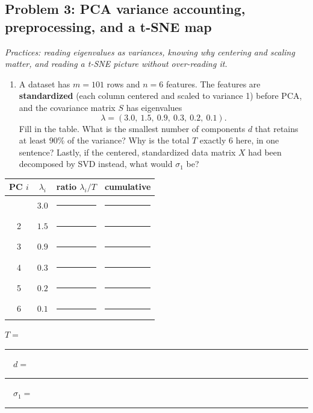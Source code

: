 \documentclass[
  11pt,
]{article}
\newcounter{none} %
\providecommand{\tightlist}{%
  \setlength{\itemsep}{0pt}\setlength{\parskip}{0pt}}
\newcommand{\answerspace}[1]{\par\vspace*{#1}}  %
\newcommand{\blank}[1][1.2in]{\rule{#1}{0.4pt}}
\newcommand{\answerpage}{\clearpage}
\begin{document}
\answerspace{1.6in}

\answerpage

\subsection{Problem 3: PCA variance accounting, preprocessing, and a
t-SNE
map}\label{problem-3-pca-variance-accounting-preprocessing-and-a-t-sne-map}

\emph{Practices: reading eigenvalues as variances, knowing why centering
and scaling matter, and reading a t-SNE picture without over-reading
it.}

\begin{enumerate}
\def\labelenumi{(\alph{enumi})}
\tightlist
\item
  A dataset has \(m = 101\) rows and \(n = 6\) features. The features
  are \textbf{standardized} (each column centered and scaled to variance
  1) before PCA, and the covariance matrix \(S\) has eigenvalues \[
  \lambda = (3.0,\ 1.5,\ 0.9,\ 0.3,\ 0.2,\ 0.1).
  \] Fill in the table. What is the smallest number of components \(d\)
  that retains at least \(90\%\) of the variance? Why is the total \(T\)
  exactly \(6\) here, in one sentence? Lastly, if the centered,
  standardized data matrix \(X\) had been decomposed by SVD instead,
  what would \(\sigma_1\) be?
\end{enumerate}

{\def\LTcaptype{none} %
\begin{longtable}[]{@{}cccc@{}}
\toprule\noalign{}
PC \(i\) & \(\lambda_i\) & ratio \(\lambda_i/T\) & cumulative \\
\midrule\noalign{}
\endhead
\bottomrule\noalign{}
\endlastfoot
1 & \(3.0\) & \blank[0.8in] & \blank[0.8in] \\
2 & \(1.5\) & \blank[0.8in] & \blank[0.8in] \\
3 & \(0.9\) & \blank[0.8in] & \blank[0.8in] \\
4 & \(0.3\) & \blank[0.8in] & \blank[0.8in] \\
5 & \(0.2\) & \blank[0.8in] & \blank[0.8in] \\
6 & \(0.1\) & \blank[0.8in] & \blank[0.8in] \\
\end{longtable}
}

\(T =\) \blank[0.6in] \(\quad d =\) \blank[0.6in] \(\quad \sigma_1 =\)
\blank[0.8in]

\answerspace{1.3in}
\end{document}
